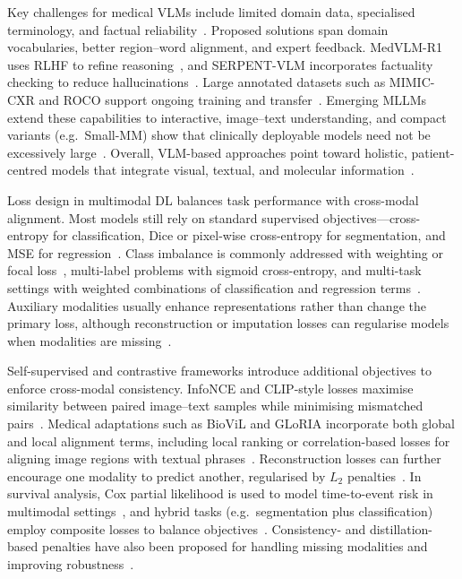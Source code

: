 Key challenges for medical VLMs include limited domain data, specialised terminology, and factual reliability~\cite{ryu2025vlmreview}. Proposed solutions span domain vocabularies, better region–word alignment, and expert feedback. MedVLM-R1 uses RLHF to refine reasoning~\cite{pan2025medvlm}, and SERPENT-VLM incorporates factuality checking to reduce hallucinations~\cite{kapadnis2024serpent}. Large annotated datasets such as MIMIC-CXR and ROCO support ongoing training and transfer~\cite{huang2020fusion,haq2025mmml}. Emerging MLLMs extend these capabilities to interactive, image–text understanding, and compact variants (e.g.\ Small-MM) show that clinically deployable models need not be excessively large~\cite{nam2025multimodal,zambrano2025smallmm}. Overall, VLM-based approaches point toward holistic, patient-centred models that integrate visual, textual, and molecular information~\cite{haq2025mmml,zhoudeep}.

Loss design in multimodal DL balances task performance with cross-modal alignment. Most models still rely on standard supervised objectives—cross-entropy for classification, Dice or pixel-wise cross-entropy for segmentation, and MSE for regression~\cite{mohsen2022artificial}. Class imbalance is commonly addressed with weighting or focal loss~\cite{kline2022multimodal,haq2025mmml}, multi-label problems with sigmoid cross-entropy, and multi-task settings with weighted combinations of classification and regression terms~\cite{huang2020fusion}. Auxiliary modalities usually enhance representations rather than change the primary loss, although reconstruction or imputation losses can regularise models when modalities are missing~\cite{haq2025mmml}.

Self-supervised and contrastive frameworks introduce additional objectives to enforce cross-modal consistency. InfoNCE and CLIP-style losses maximise similarity between paired image–text samples while minimising mismatched pairs~\cite{windsor2023vision,ryu2025vlmreview}. Medical adaptations such as BioViL and GLoRIA incorporate both global and local alignment terms, including local ranking or correlation-based losses for aligning image regions with textual phrases~\cite{huang2021gloria}. Reconstruction losses can further encourage one modality to predict another, regularised by $L_2$ penalties~\cite{stahlschmidt2022,krones2025review}. In survival analysis, Cox partial likelihood is used to model time-to-event risk in multimodal settings~\cite{huang2020fusion}, and hybrid tasks (e.g.\ segmentation plus classification) employ composite losses to balance objectives~\cite{oltu2025automated,hasan2024recent}. Consistency- and distillation-based penalties have also been proposed for handling missing modalities and improving robustness~\cite{huang2020fusion,fang2024aligning}.

